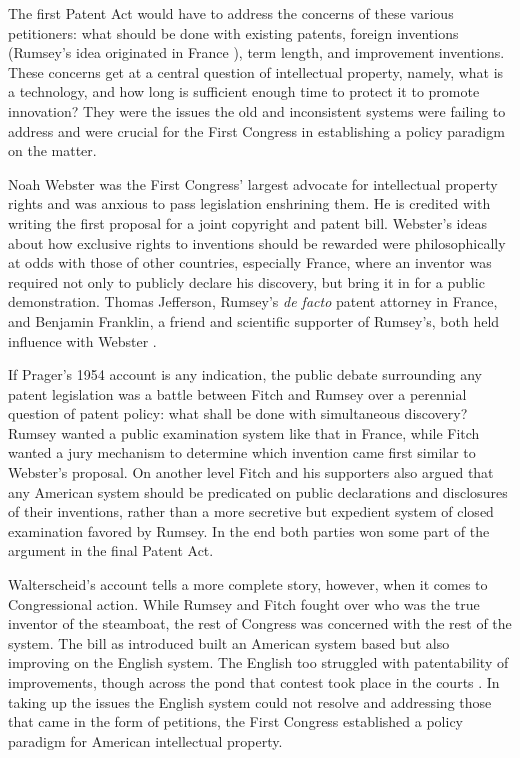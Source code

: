 \documentclass[pdftex,11pt,letterpaper]{article}
\begin{document}
The first Patent Act would have to address the concerns of these various petitioners: what should be done with existing patents, foreign inventions (Rumsey's idea originated in France \autocite{Prager1954}), term length, and improvement inventions. These concerns get at a central question of intellectual property, namely, what is a technology, and how long is sufficient enough time to protect it to promote innovation? They were the issues the old and inconsistent systems were failing to address and were crucial for the First Congress in establishing a policy paradigm on the matter.

Noah Webster was the First Congress' largest advocate for intellectual property rights and was anxious to pass legislation enshrining them. He is credited with writing the first proposal for a joint copyright and patent bill. Webster's ideas about how exclusive rights to inventions should be rewarded were philosophically at odds with those of other countries, especially France, where an inventor was required not only to publicly declare his discovery, but bring it in for a public demonstration. Thomas Jefferson, Rumsey's \emph{de facto} patent attorney in France, and Benjamin Franklin, a friend and scientific supporter of Rumsey's, both held influence with Webster \autocite[159-161]{Prager1954}.

If Prager's 1954 account is any indication, the public debate surrounding any patent legislation was a battle between Fitch and Rumsey over a perennial question of patent policy: what shall be done with simultaneous discovery? Rumsey wanted a public examination system like that in France, while Fitch wanted a jury mechanism to determine which invention came first similar to Webster's proposal. On another level Fitch and his supporters also argued that any American system should be predicated on public declarations and disclosures of their inventions, rather than a more secretive but expedient system of closed examination favored by Rumsey. In the end both parties won some part of the argument in the final Patent Act.

Walterscheid's account tells a more complete story, however, when it comes to Congressional action. While Rumsey and Fitch fought over who was the true inventor of the steamboat, the rest of Congress was concerned with the rest of the system. The bill as introduced built an American system based but also improving on the English system. The English too struggled with patentability of improvements, though across the pond that contest took place in the courts \autocite{Walterscheid1997}. In taking up the issues the English system could not resolve and addressing those that came in the form of petitions, the First Congress established a policy paradigm for American intellectual property. 
\end{document}
